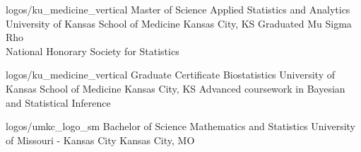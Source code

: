 
\EducationExtraNoDate
{logos/ku_medicine_vertical}
{Master of Science}
{Applied Statistics and Analytics}
{University of Kansas School of Medicine}
{Kansas City, KS}
{Graduated Mu Sigma Rho\\ National Honorary Society for
Statistics}

\vspace*{0.01 in}

\EducationExtraNoDate
{logos/ku_medicine_vertical}
{Graduate Certificate}
{Biostatistics}
{University of Kansas School of Medicine}
{Kansas City, KS}
{Advanced coursework in Bayesian and Statistical Inference}

\vspace*{0.01 in}

\EducationNoDate
{logos/umkc_logo_sm}
{Bachelor of Science}
{Mathematics and Statistics}
{University of Missouri - Kansas City}
{Kansas City, MO}